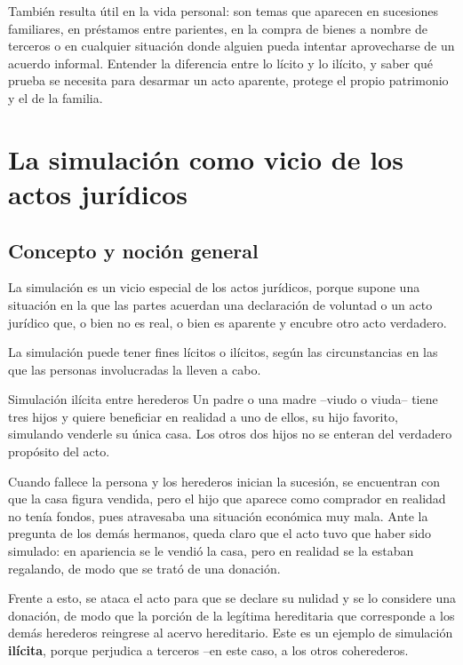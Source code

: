 \documentclass[12pt,oneside]{book}
\begin{document}
También resulta útil en la vida personal: son temas que aparecen en sucesiones familiares, en préstamos entre parientes, en la compra de bienes a nombre de terceros o en cualquier situación donde alguien pueda intentar aprovecharse de un acuerdo informal. Entender la diferencia entre lo lícito y lo ilícito, y saber qué prueba se necesita para desarmar un acto aparente, protege el propio patrimonio y el de la familia.

\chapter[La simulación]{La simulación como vicio de los actos jurídicos}

\section{Concepto y noción general}

La simulación es un vicio especial de los actos jurídicos, porque supone una situación en la que las partes acuerdan una declaración de voluntad o un acto jurídico que, o bien no es real, o bien es aparente y encubre otro acto verdadero.

La simulación puede tener fines lícitos o ilícitos, según las circunstancias en las que las personas involucradas la lleven a cabo.

\begin{example}{Simulación ilícita entre herederos}
Un padre o una madre --viudo o viuda-- tiene tres hijos y quiere beneficiar en realidad a uno de ellos, su hijo favorito, simulando venderle su única casa. Los otros dos hijos no se enteran del verdadero propósito del acto.

Cuando fallece la persona y los herederos inician la sucesión, se encuentran con que la casa figura vendida, pero el hijo que aparece como comprador en realidad no tenía fondos, pues atravesaba una situación económica muy mala. Ante la pregunta de los demás hermanos, queda claro que el acto tuvo que haber sido simulado: en apariencia se le vendió la casa, pero en realidad se la estaban regalando, de modo que se trató de una donación.

Frente a esto, se ataca el acto para que se declare su nulidad y se lo considere una donación, de modo que la porción de la legítima hereditaria que corresponde a los demás herederos reingrese al acervo hereditario. Este es un ejemplo de simulación \textbf{ilícita}, porque perjudica a terceros --en este caso, a los otros coherederos.
\end{example}
\end{document}
